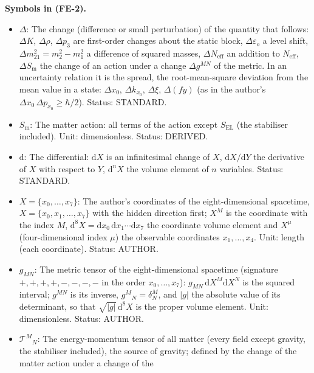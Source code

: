 \documentclass[
  10pt,
]{article}
\providecommand{\tightlist}{%
  \setlength{\itemsep}{0pt}\setlength{\parskip}{0pt}}
\begin{document}
\textbf{Symbols in (FE-2).}

\begin{itemize}
\tightlist
\item
  \(\Delta\): The change (difference or small perturbation) of the
  quantity that follows: \(\Delta K\), \(\Delta\rho\), \(\Delta p_3\)
  are first-order changes about the static block,
  \(\Delta\varepsilon_o\) a level shift,
  \(\Delta m^2_{21} = m_2^2 - m_1^2\) a difference of squared masses,
  \(\Delta N_{\mathrm{eff}}\) an addition to \(N_{\mathrm{eff}}\),
  \(\Delta S_{\mathrm{m}}\) the change of an action under a change
  \(\Delta g^{MN}\) of the metric. In an uncertainty relation it is the
  spread, the root-mean-square deviation from the mean value in a state:
  \(\Delta x_0\), \(\Delta k_{x_0}\), \(\Delta\xi\), \(\Delta(fy)\) (as
  in the author's \(\Delta x_0\,\Delta p_{x_0} \ge \hbar/2\)). Status:
  STANDARD.
\item
  \(S_{\mathrm{m}}\): The matter action: all terms of the action except
  \(S_{\mathrm{EL}}\) (the stabiliser included). Unit: dimensionless.
  Status: DERIVED.
\item
  \(\mathrm{d}\): The differential: \(\mathrm{d}X\) is an infinitesimal
  change of \(X\), \(\mathrm{d}X/\mathrm{d}Y\) the derivative of \(X\)
  with respect to \(Y\), \(\mathrm{d}^nX\) the volume element of \(n\)
  variables. Status: STANDARD.
\item
  \(X = \{x_0, \dots, x_7\}\): The author's coordinates of the
  eight-dimensional spacetime, \(X = \{x_0, x_1, \dots, x_7\}\) with the
  hidden direction first; \(X^M\) is the coordinate with the index
  \(M\),
  \(\mathrm{d}^8X = \mathrm{d}x_0\,\mathrm{d}x_1\cdots\mathrm{d}x_7\)
  the coordinate volume element and \(X^\mu\) (four-dimensional index
  \(\mu\)) the observable coordinates \(x_1, \dots, x_4\). Unit: length
  (each coordinate). Status: AUTHOR.
\item
  \(g_{MN}\): The metric tensor of the eight-dimensional spacetime
  (signature \(+,+,+,+,-,-,-,-\) in the order \(x_0, \dots, x_7\)):
  \(g_{MN}\,\mathrm{d}X^M\mathrm{d}X^N\) is the squared interval;
  \(g^{MN}\) is its inverse, \(g^M{}_N = \delta^M_N\), and
  \(\lvert g\rvert\) the absolute value of its determinant, so that
  \(\sqrt{\lvert g\rvert}\,\mathrm{d}^8X\) is the proper volume element.
  Unit: dimensionless. Status: AUTHOR.
\item
  \(\mathcal{T}^M{}_N\): The energy-momentum tensor of all matter (every
  field except gravity, the stabiliser included), the source of gravity;
  defined by the change of the matter action under a change of the

\end{itemize}
\end{document}
